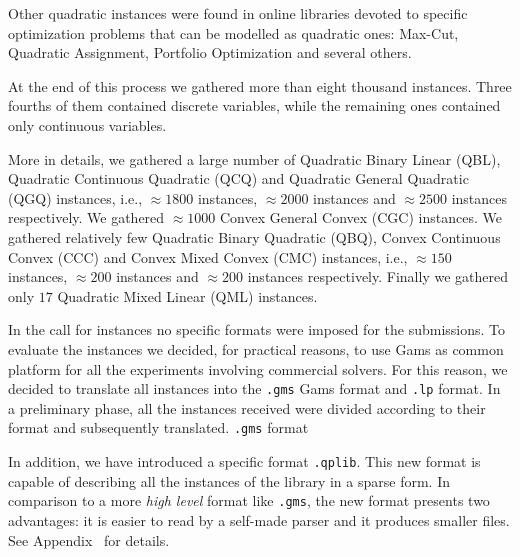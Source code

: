 Other quadratic instances were found in online libraries devoted to
specific optimization problems that can be modelled as quadratic ones:
Max-Cut, Quadratic Assignment, Portfolio Optimization and several
others.

At the end of this process we gathered more than eight thousand
instances. Three fourths of them contained discrete variables, while
the remaining ones contained only continuous variables.

More in details, we gathered a large number of Quadratic Binary Linear
(QBL), Quadratic Continuous Quadratic (QCQ) and Quadratic General
Quadratic (QGQ) instances, i.e., $\approx 1800$ instances, $\approx
2000$ instances and $\approx 2500$ instances respectively.
We gathered $\approx 1000$ Convex General Convex (CGC) instances. We
gathered relatively few Quadratic Binary Quadratic (QBQ), Convex
Continuous Convex (CCC) and Convex Mixed Convex (CMC) instances, i.e.,
$\approx 150$ instances, $\approx 200$ instances and $\approx 200$
instances respectively. Finally we gathered only $17$ Quadratic Mixed
Linear (QML) instances.

In the call for instances no specific formats were imposed
for the submissions.
To evaluate the instances we decided, for practical reasons, to use
Gams as common platform for all the experiments involving commercial
solvers.
For this reason, we decided to translate all instances into the
\texttt{.gms} Gams format and \texttt{.lp} format.
 In a preliminary phase, all the instances received were divided
according to their format and subsequently translated.
\texttt{.gms} format

In addition, we have introduced
a specific format \texttt{.qplib}. This new format is capable of describing
all the instances of the library in a sparse form.
In comparison to a more \emph{high level} format like \texttt{.gms}, the new
format presents two advantages:
it is easier to read by a self-made parser and it produces smaller files.
See Appendix~\label{sec:format} for details.


